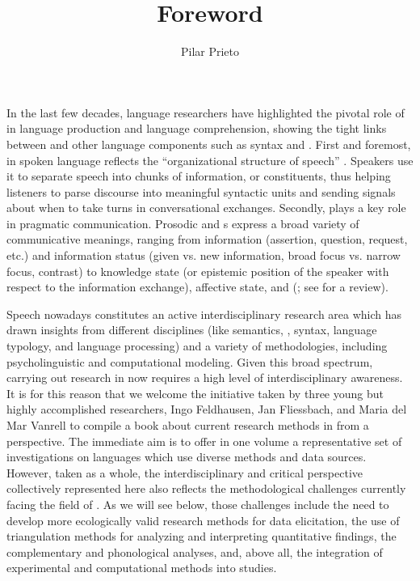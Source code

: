 \documentclass[output=paper]{langsci/langscibook}
\title{Foreword}
\author{Pilar Prieto\affiliation{ICREA-Universitat Pompeu Fabra}}
\begin{document}
\label{chap:prefaceEd}
In the last few decades, language researchers have highlighted the pivotal role of  in language production and language comprehension, showing the tight links between  and other language components such as syntax and . First and foremost,  in spoken language reflects the ``organizational structure of speech'' \citep{Beckman.1996}. Speakers use it to separate speech into chunks of information, or  constituents, thus helping listeners to parse discourse into meaningful syntactic units and sending signals about when to take turns in conversational exchanges. Secondly,  plays a key role in pragmatic communication. Prosodic and s express a broad variety of communicative meanings, ranging from  information (assertion, question, request, etc.) and information status (given vs. new information, broad focus vs. narrow focus, contrast) to knowledge state (or epistemic position of the speaker with respect to the information exchange), affective state, and  (\citealt{Gussenhoven2004,Ladd2008,Nespor2007}; see \citealt{Prieto.2015} for a review). 

Speech  nowadays constitutes an active interdisciplinary research area which has drawn insights from different disciplines (like semantics, , syntax, language typology, and language processing) and a variety of methodologies, including psycholinguistic and computational modeling. Given this broad spectrum, carrying out research in  now requires a high level of interdisciplinary awareness. It is for this reason that we welcome the initiative taken by three young but highly accomplished researchers, Ingo Feldhausen, Jan Fliessbach, and Maria del Mar Vanrell to compile a book about current research methods in  from a  perspective. The immediate aim is to offer in one volume a representative set of  investigations on  languages which use diverse methods and data sources. However, taken as a whole, the interdisciplinary and critical perspective collectively represented here also reflects the methodological challenges currently facing the field of . As we will see below, those challenges include the need to develop more ecologically valid research methods for data elicitation, the use of triangulation methods for analyzing and interpreting quantitative findings, the complementary  and phonological analyses, and, above all, the integration of experimental and computational methods into  studies. 
\end{document}

